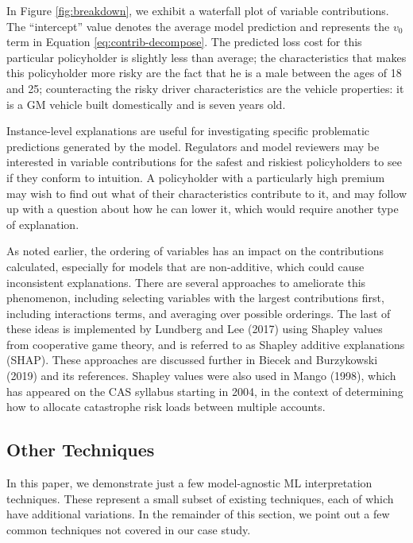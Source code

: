 \documentclass[preprint, 3p, twocolumn, letterpaper, 10pt]{elsarticle} %
\begin{document}
In Figure \ref{fig:breakdown}, we exhibit a waterfall plot of variable
contributions. The ``intercept'' value denotes the average model prediction and
represents the \(v_0\) term in Equation \eqref{eq:contrib-decompose}. The predicted
loss cost for this particular policyholder is slightly less than average; the
characteristics that makes this policyholder more risky are the fact that he is
a male between the ages of 18 and 25; counteracting the risky driver
characteristics are the vehicle properties: it is a GM vehicle built
domestically and is seven years old.

Instance-level explanations are useful for investigating specific problematic
predictions generated by the model. Regulators and model reviewers may be
interested in variable contributions for the safest and riskiest policyholders
to see if they conform to intuition. A policyholder with a particularly high
premium may wish to find out what of their characteristics contribute to it,
and may follow up with a question about how he can lower it, which would
require another type of explanation.

As noted earlier, the ordering of variables has an impact on the contributions
calculated, especially for models that are non-additive, which could cause
inconsistent explanations. There are several approaches to ameliorate this
phenomenon, including selecting variables with the largest contributions first,
including interactions terms, and averaging over possible orderings. The last
of these ideas is implemented by Lundberg and Lee (2017) using Shapley values from
cooperative game theory, and is referred to as Shapley additive explanations
(SHAP). These approaches are discussed further in Biecek and Burzykowski (2019) and its references.
Shapley values were also used in Mango (1998), which has appeared on the CAS syllabus
starting in 2004, in the context of determining how to allocate catastrophe
risk loads between multiple accounts.

\hypertarget{other-techniques}{%
\subsection{Other Techniques}\label{other-techniques}}

In this paper, we demonstrate just a few model-agnostic ML interpretation
techniques. These represent a small subset of existing techniques, each of
which have additional variations. In the remainder of this section, we point
out a few common techniques not covered in our case study.
\end{document}
